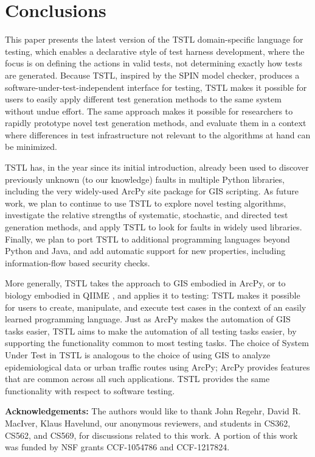 \section{Conclusions}
\label{sec:conclusion}

This paper presents the latest version of the TSTL
\cite{NFM15,ISSTA15,tstl} domain-specific language for testing, which
enables a declarative style of test harness development, where the
focus is on defining the actions in valid tests, not determining
exactly how tests are generated.  Because TSTL, inspired by the SPIN
model checker, produces a software-under-test-independent interface
for testing, TSTL makes it possible for users to easily apply
different test generation methods to the same system without undue
effort.  The same approach makes it possible for researchers to rapidly prototype novel test generation
methods, and evaluate them in a context where differences in test
infrastructure not relevant to the algorithms at hand can be minimized.

TSTL has, in the year since its initial introduction,
already been used to discover previously unknown (to our knowledge)
faults in multiple Python libraries, including the very widely-used
ArcPy site package for GIS scripting. 
As future work, we plan to continue to use TSTL to explore novel
testing algorithms, investigate the relative strengths of systematic,
stochastic, and directed test generation methods, and apply TSTL to
look for faults in widely used libraries.  Finally, we plan to
port TSTL to additional
programming languages beyond Python and Java, and add automatic
support for new properties, including
information-flow based security checks.

More generally, TSTL takes the approach to GIS embodied in ArcPy, or
to biology embodied in QIIME \cite{QIIME}, and applies it to testing:  TSTL
makes it possible for users to create, manipulate, and execute test
cases in the context of an easily learned programming language.  Just
as ArcPy makes the automation of GIS tasks easier, TSTL aims to make
the automation of all testing tasks easier, by supporting the
functionality common to most testing tasks.  The choice of System
Under Test in TSTL is analogous to the choice of using GIS to analyze
epidemiological data or urban traffic routes using ArcPy; ArcPy
provides features that are common across all such applications.  TSTL
provides the same functionality with respect to software testing.

{\bf Acknowledgements:} The authors would like to thank John Regehr,
David R. MacIver, Klaus Havelund, our anonymous reviewers, and
students in CS362, CS562, and CS569, for discussions related to this work.
A portion of this work was funded by NSF grants CCF-1054786 and
CCF-1217824.
